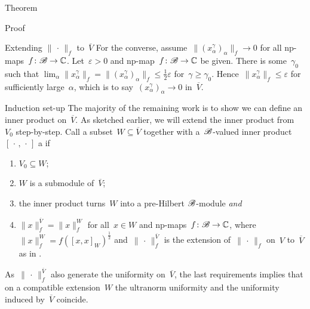 \documentclass[b]{subfiles}
\begin{document}
\begin{parsec}
\begin{point}{Theorem}
\begin{point}{Proof}
\begin{point}{Extending $\|\,\cdot\,\|_f$ to~$\overline{V}$}
For the converse, assume~$\|(x^\gamma_\alpha)_\alpha\|_f \to 0$
    for all np-maps~$f\colon \mathscr{B} \to \mathbb{C}$.
Let~$\varepsilon > 0$ and np-map~$f\colon \mathscr{B} \to \mathbb{C}$ be given.
There is some~$\gamma_0$ such that
$\lim_\alpha \|x^\gamma_\alpha \|_f = \|(x^\gamma_\alpha)_\alpha\|_f
\leq \frac{1}{2}\varepsilon$
for~$\gamma\geq\gamma_0$.
Hence~$\|x^\gamma_\alpha\|_f \leq \varepsilon$
    for sufficiently large~$\alpha$,
    which is to say~$(x^\gamma_\alpha)_\alpha \to 0$ in~$\overline{V}$.
\end{point}
\begin{point}{Induction set-up}%
The majority of the remaining work is to show
    we can define an inner product on~$\overline{V}$.
As sketched earlier,
    we will extend the inner product
    from~$V_0$ step-by-step.
Call a subset~$W \subseteq \overline{V}$
together with a~$\mathscr{B}$-valued inner product~$[\,\cdot\,,\,\cdot\,]$ a
     if
\begin{enumerate}
\item $V_0 \subseteq W$;
\item $W$ is a submodule of~$\overline{V}$;
\item the inner product turns~$W$ into a pre-Hilbert $\mathscr{B}$-module \emph{and}
\item $\|x\|_f^{\overline{V}} = \|x\|_f^W$
        for all~$x \in W$
        and np-maps~$f\colon \mathscr{B} \to \mathbb{C}$,
        where~$\|x\|_f^W = f([x,x]_W)^{\frac{1}{2}}$
        and~$\|\,\cdot\,\|^{\overline{V}}_f$
        is the extension of~$\|\,\cdot\,\|_f$
        on~$V$ to~$\overline{V}$
        as in .
\end{enumerate}
As~$\|\,\cdot\,\|^{\overline{V}}_f$ also
    generate the uniformity on~$\overline{V}$,
    the last requirements implies
    that on a compatible extension~$W$
    the ultranorm uniformity and
    the uniformity induced by~$\overline{V}$
    coincide.


\end{point}
\end{point}
\end{point}
\end{parsec}
\end{document}

